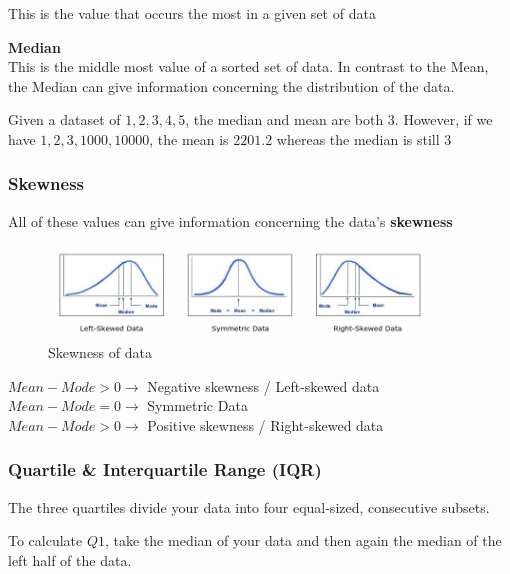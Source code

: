 \documentclass[11pt]{article}
\begin{document}
This is the value that occurs the most in a given set of data

\vspace{10px}

\noindent \textbf{Median} \\

This is the middle most value of a sorted set of data. In contrast to the Mean, the Median can give information concerning the distribution of the data.

Given a dataset of $1, 2, 3, 4, 5$, the median and mean are both $3$. However, if we have $1, 2, 3, 1000, 10000$, the mean is $2201.2$ whereas the median is still $3$

\newpage

\subsubsection{Skewness}

All of these values can give information concerning the data's \textbf{skewness}

\begin{figure}[htb!]
    \centering
    \includegraphics[keepaspectratio=true, width=0.9\textwidth]{skewness.png}
    \caption{Skewness of data}
    \label{fig:skewness}
\end{figure}

\noindent
$Mean - Mode > 0 \rightarrow$ Negative skewness / Left-skewed data \\
$Mean - Mode = 0 \rightarrow$ Symmetric Data \\
$Mean - Mode > 0 \rightarrow$ Positive skewness / Right-skewed data

\vspace{10px}

\subsubsection{Quartile \& Interquartile Range (IQR)}

The three quartiles divide your data into four equal-sized, consecutive subsets.

To calculate $Q1$, take the median of your data and then again the median of the left half of the data.
\end{document}
